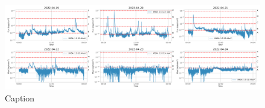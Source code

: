    \begin{figure}[H]
        \centering
        \includegraphics[width = \textwidth]{report/Figures/methods/GOES_total.png}
        \caption{Caption}
        \label{goes_tot}
    \end{figure}
    